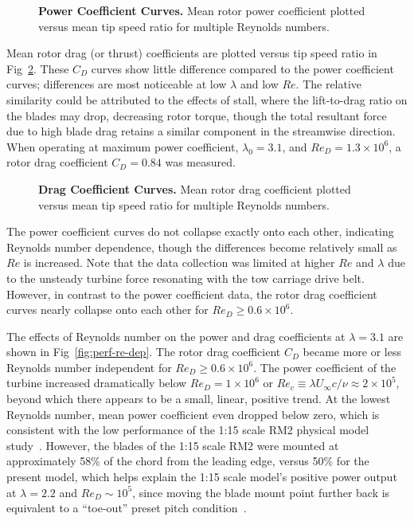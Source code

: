 \documentclass[10pt,letterpaper]{article}
\begin{document}
\begin{figure}

    \caption{{\bf Power Coefficient Curves.} Mean rotor power coefficient
    plotted versus mean tip speed ratio for multiple Reynolds numbers.}

    \label{fig:cp-curves}
\end{figure}

Mean rotor drag (or thrust) coefficients are plotted versus tip speed ratio in
Fig~\ref{fig:cd-curves}. These $C_D$ curves show little difference compared to
the power coefficient curves; differences are most noticeable at low $\lambda$
and low $Re$. The relative similarity could be attributed to the effects of
stall, where the lift-to-drag ratio on the blades may drop, decreasing rotor
torque, though the total resultant force due to high blade drag retains a
similar component in the streamwise direction. When operating at maximum power
coefficient, $\lambda_0=3.1$, and $Re_D=1.3 \times 10^6$, a rotor drag
coefficient $C_D=0.84$ was measured.

\begin{figure}

    \caption{{\bf Drag Coefficient Curves.} Mean rotor drag coefficient plotted
    versus mean tip speed ratio for multiple Reynolds numbers.}

    \label{fig:cd-curves}
\end{figure}

The power coefficient curves do not collapse exactly onto each other, indicating
Reynolds number dependence, though the differences become relatively small as
$Re$ is increased. Note that the data collection was limited at higher $Re$ and
$\lambda$ due to the unsteady turbine force resonating with the tow carriage
drive belt. However, in contrast to the power coefficient data, the rotor drag
coefficient curves nearly collapse onto each other for $Re_D \ge 0.6 \times
10^6$.

The effects of Reynolds number on the power and drag coefficients at
$\lambda=3.1$ are shown in Fig~\ref{fig:perf-re-dep}. The rotor drag
coefficient $C_D$ became more or less Reynolds number independent for $Re_D \ge
0.6 \times 10^6$. The power coefficient of the turbine increased dramatically
below $Re_D = 1 \times 10^6$ or $Re_c \equiv \lambda U_\infty c / \nu \approx 2
\times 10^5$, beyond which there appears to be a small, linear, positive trend.
At the lowest Reynolds number, mean power coefficient even dropped below zero,
which is consistent with the low performance of the 1:15 scale RM2 physical
model study~\cite{Hill2014}. However, the blades of the 1:15 scale RM2 were
mounted at approximately 58\% of the chord from the leading edge, versus 50\%
for the present model, which helps explain the 1:15 scale model's positive power
output at $\lambda=2.2$ and $Re_D \sim 10^5$, since moving the blade mount point
further back is equivalent to a ``toe-out'' preset pitch
condition~\cite{Fiedler2009}.
\end{document}
